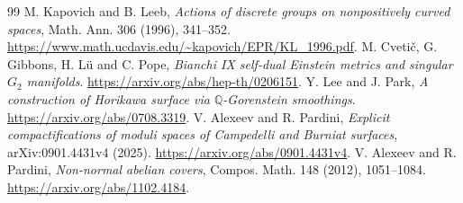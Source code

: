 \documentclass[a4paper,11pt]{article}
\numberwithin{equation}{section}
\theoremstyle{definition}
\begin{document}
\begin{thebibliography}{99}
 M. Kapovich and B. Leeb, \emph{Actions of discrete groups on nonpositively curved spaces}, Math. Ann. 306 (1996), 341--352. \url{https://www.math.ucdavis.edu/~kapovich/EPR/KL_1996.pdf}.
 M. Cveti\v c, G. Gibbons, H. L\"u and C. Pope, \emph{Bianchi IX self-dual Einstein metrics and singular $G_2$ manifolds}. \url{https://arxiv.org/abs/hep-th/0206151}.
 Y. Lee and J. Park, \emph{A construction of Horikawa surface via $\mathbb Q$-Gorenstein smoothings}. \url{https://arxiv.org/abs/0708.3319}.
 V. Alexeev and R. Pardini, \emph{Explicit compactifications of moduli spaces of Campedelli and Burniat surfaces}, arXiv:0901.4431v4 (2025). \url{https://arxiv.org/abs/0901.4431v4}.
 V. Alexeev and R. Pardini, \emph{Non-normal abelian covers}, Compos. Math. 148 (2012), 1051--1084. \url{https://arxiv.org/abs/1102.4184}.
\end{thebibliography}
\end{document}
